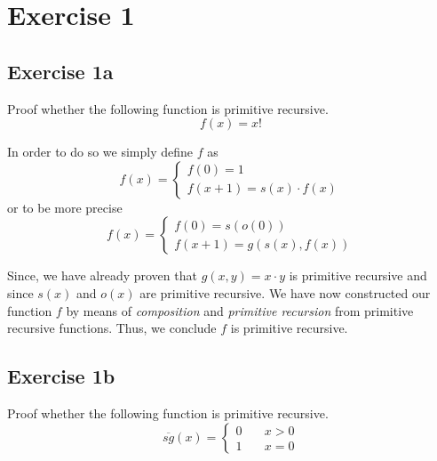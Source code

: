 \documentclass[11pt,a4paper]{article}
\begin{document}

\section*{Exercise 1}

\subsection*{Exercise 1a}
Proof whether the following function is primitive recursive.
\begin{equation*}
f(x)=x!
\end{equation*}


In order to do so we simply define $f$ as
\begin{equation*}
f(x)=
\begin{cases}
   f(0) = 1         \\
   f(x+1)= s(x) \cdot f(x)  
 \end{cases}
\end{equation*}
 or to be more precise  
\begin{equation*}
f(x)=
\begin{cases}
   f(0) = s(o(0))         \\
   f(x+1)=  g(s(x),f(x))  
 \end{cases}
\end{equation*}

Since, we have already proven that $g(x,y)=x \cdot y$ is primitive recursive and 
since  $s(x)$ and $o(x)$ are primitive recursive. We have now constructed our function 
$f$ by means of \emph{composition} and \emph{primitive recursion} from primitive recursive functions.
Thus, we conclude $f$ is primitive recursive.

\subsection*{Exercise 1b}
Proof whether the following function is primitive recursive.
\begin{equation*}
\overline{sg}(x)=
\begin{cases}
    0          & \quad x > 0 \\
    1  & \quad   x = 0
\end{cases}
\end{equation*}


\bigbreak
\end{document}
